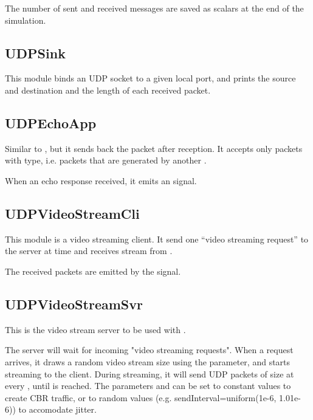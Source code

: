 The number of sent and received messages are saved as scalars at the end of the
simulation.


\subsection{UDPSink}

This module binds an UDP socket to a given local port, and prints the
source and destination and the length of each received packet.


\subsection{UDPEchoApp}

Similar to , but it sends back the packet after reception.
It accepts only packets with  type, i.e. packets that
are generated by another .

When an echo response received, it emits an  signal.

\subsection{UDPVideoStreamCli}

This module is a video streaming client. It send one ``video streaming request'' to
the server at time  and receives stream from .

The received packets are emitted by the  signal.

\subsection{UDPVideoStreamSvr}

This is the video stream server to be used with .

The server will wait for incoming "video streaming requests".
When a request arrives, it draws a random video stream size
using the  parameter, and starts streaming to the client.
During streaming, it will send UDP packets of size  at every
, until  is reached. The parameters 
and  can be set to constant values to create CBR traffic,
or to random values (e.g. sendInterval=uniform(1e-6, 1.01e-6)) to
accomodate jitter.

